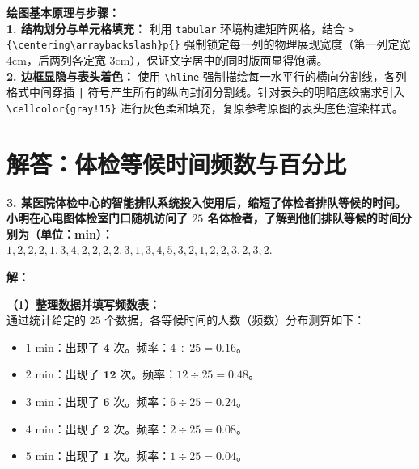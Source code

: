 \vspace{0.6cm}

{\small\color{blue!70!black}
\textbf{绘图基本原理与步骤：}\\
\textbf{1. 结构划分与单元格填充：} 利用 \texttt{tabular} 环境构建矩阵网格，结合 \texttt{>\{\textbackslash centering\textbackslash arraybackslash\}p\{\}} 强制锁定每一列的物理展现宽度（第一列定宽 4cm，后两列各定宽 3cm），保证文字居中的同时版面显得饱满。\\
\textbf{2. 边框显隐与表头着色：} 使用 \texttt{\textbackslash hline} 强制描绘每一水平行的横向分割线，各列格式中间穿插 \texttt{|} 符号产生所有的纵向封闭分割线。针对表头的明暗底纹需求引入 \texttt{\textbackslash cellcolor\{gray!15\}} 进行灰色柔和填充，复原参考原图的表头底色渲染样式。
}

\newpage



\section{解答：体检等候时间频数与百分比}

\vspace{0.6cm}

\textbf{3. 某医院体检中心的智能排队系统投入使用后，缩短了体检者排队等候的时间。小明在心电图体检室门口随机访问了 $25$ 名体检者，了解到他们排队等候的时间分别为（单位：min）：\\
$1, 2, 2, 2, 1, 3, 4, 2, 2, 2, 2, 3, 1, 3, 4, 5, 3, 2, 1, 2, 2, 3, 2, 3, 2.$}

\vspace{0.4cm}

\textbf{解：}

\textbf{（1）整理数据并填写频数表：} \\
通过统计给定的 $25$ 个数据，各等候时间的人数（频数）分布测算如下：
\begin{itemize}
  \item \textbf{$1\text{ min}$}：出现了 $\boldsymbol{4}$ 次。频率：$4 \div 25 = \boldsymbol{0.16}$。
  \item \textbf{$2\text{ min}$}：出现了 $\boldsymbol{12}$ 次。频率：$12 \div 25 = \boldsymbol{0.48}$。
  \item \textbf{$3\text{ min}$}：出现了 $\boldsymbol{6}$ 次。频率：$6 \div 25 = \boldsymbol{0.24}$。
  \item \textbf{$4\text{ min}$}：出现了 $\boldsymbol{2}$ 次。频率：$2 \div 25 = \boldsymbol{0.08}$。
  \item \textbf{$5\text{ min}$}：出现了 $\boldsymbol{1}$ 次。频率：$1 \div 25 = \boldsymbol{0.04}$。
\end{itemize}

